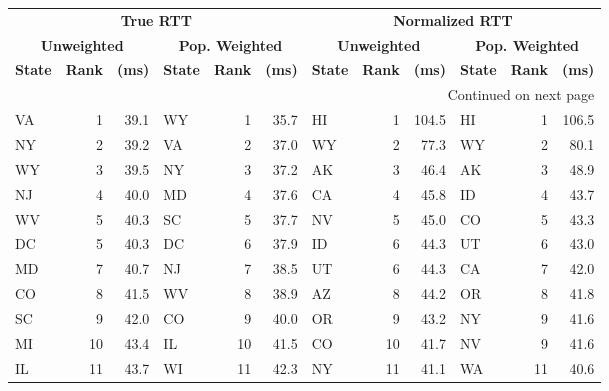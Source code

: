 \begin{longtable}{lrr|lrr||lrr|lrr}
  \multicolumn{6}{c||}{\textbf{True RTT}} & \multicolumn{6}{c}{\textbf{Normalized RTT}} \\
\multicolumn{3}{c|}{\textbf{Unweighted}} & \multicolumn{3}{c||}{\textbf{Pop. Weighted}} & \multicolumn{3}{c|}{\textbf{Unweighted}} & \multicolumn{3}{c}{\textbf{Pop. Weighted}} \\
     \textbf{State} & \textbf{Rank} & \textbf{(ms)} & \textbf{State} & \textbf{Rank} & \textbf{(ms)} &\textbf{State} & \textbf{Rank} & \textbf{(ms)} &\textbf{State} & \textbf{Rank} & \textbf{(ms)} \\
\midrule
\endhead
\midrule
\multicolumn{12}{r}{{Continued on next page}} \\
\midrule
\endfoot
\bottomrule
\endlastfoot
        VA &    1 &   39.1 &            WY &    1 &  35.7 &             HI &    1 &  104.5 &            HI &    1 &  106.5 \\
        NY &    2 &   39.2 &            VA &    2 &  37.0 &             WY &    2 &   77.3 &            WY &    2 &   80.1 \\
        WY &    3 &   39.5 &            NY &    3 &  37.2 &             AK &    3 &   46.4 &            AK &    3 &   48.9 \\
        NJ &    4 &   40.0 &            MD &    4 &  37.6 &             CA &    4 &   45.8 &            ID &    4 &   43.7 \\
        WV &    5 &   40.3 &            SC &    5 &  37.7 &             NV &    5 &   45.0 &            CO &    5 &   43.3 \\
        DC &    5 &   40.3 &            DC &    6 &  37.9 &             ID &    6 &   44.3 &            UT &    6 &   43.0 \\
        MD &    7 &   40.7 &            NJ &    7 &  38.5 &             UT &    6 &   44.3 &            CA &    7 &   42.0 \\
        CO &    8 &   41.5 &            WV &    8 &  38.9 &             AZ &    8 &   44.2 &            OR &    8 &   41.8 \\
        SC &    9 &   42.0 &            CO &    9 &  40.0 &             OR &    9 &   43.2 &            NY &    9 &   41.6 \\
        MI &   10 &   43.4 &            IL &   10 &  41.5 &             CO &   10 &   41.7 &            NV &    9 &   41.6 \\
        IL &   11 &   43.7 &            WI &   11 &  42.3 &             NY &   11 &   41.1 &            WA &   11 &   40.6 \\

\end{longtable}
